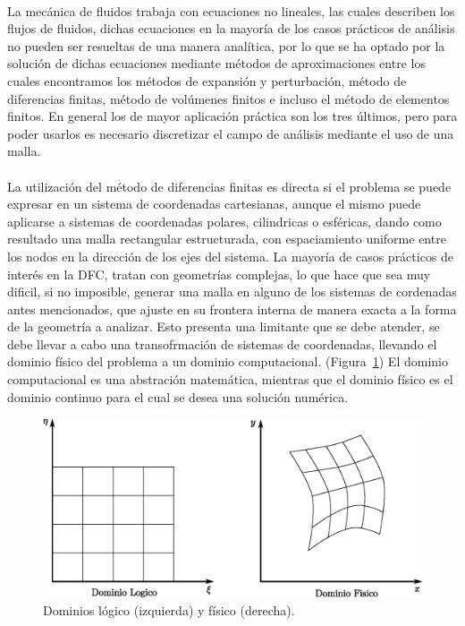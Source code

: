 \documentclass[letterpaper, openright, 12pt]{book}
\begin{document}
    \paragraph*{}
    La mecánica de fluidos trabaja con ecuaciones no lineales, las cuales
    describen los flujos de fluidos, dichas ecuaciones en la mayoría de los
    casos prácticos de análisis no pueden ser resueltas de una manera analítica,
    por lo que se ha optado por la solución de dichas ecuaciones mediante
    métodos de aproximaciones entre los cuales encontramos los métodos de
    expansión y perturbación, método de diferencias finitas, método de volúmenes
    finitos e incluso el método de elementos finitos. En general los de mayor
    aplicación práctica son los tres últimos, pero para poder usarlos es
    necesario discretizar el campo de análisis mediante el uso de una malla.\cite{thompsonhandbook}
    \paragraph*{}
    La utilización del método de diferencias finitas es directa si el problema
    se puede expresar en un sistema de coordenadas cartesianas, aunque el mismo
    puede aplicarse a sistemas de coordenadas polares, cilindricas o esféricas,
    dando como resultado una malla rectangular estructurada, con espaciamiento
    uniforme entre los nodos en la dirección de los ejes del sistema. La mayoría
    de casos prácticos de interés en la DFC, tratan con geometrías complejas,
    lo que hace que sea muy dificil, si no imposible, generar una malla en
    alguno de los sistemas de cordenadas antes mencionados, que ajuste en su
    frontera interna de manera exacta a la forma de la geometría a analizar.
    Esto presenta una limitante que se debe atender, se debe llevar a cabo una
    transofrmación de sistemas de coordenadas, llevando el dominio físico del
    problema a un dominio computacional. (Figura~\ref{fig:dominios}) El dominio
    computacional es una abstración matemática, mientras que el dominio físico
    es el dominio continuo para el cual se desea una solución numérica.
    \begin{figure}[htbp!]
        \centering
        \includegraphics[keepaspectratio, width=170mm]{./Imagenes/dominios}
        \caption[Dominios lógico y físico]{Dominios lógico (izquierda) y físico (derecha). \cite{numerical-grid}}
        \label{fig:dominios}
    \end{figure}
\end{document}
